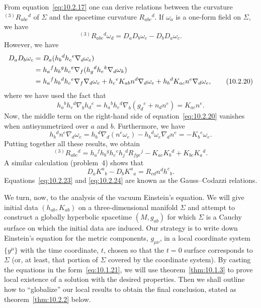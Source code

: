 From equation~\eqref{eq:10.2.17} one can derive relations between the curvature
\({}^{(3)}R_{abc}{}^d\) of \(\Sigma\) and the spacetime curvature \(R_{abc}{}^d\).
If \(\omega_a\) is a one-form field on \(\Sigma\), we have
\begin{equation}
  {}^{(3)}R_{abc}{}^d\omega_d=D_aD_b\omega_c-D_bD_a\omega_c.
  \tag{10.2.19}\label{eq:10.2.19}
\end{equation}
However, we have
\begin{align}
  D_aD_b\omega_c
  &=D_a(h_b{}^dh_c{}^e\nabla_d\omega_e) \notag\\
  &=h_a{}^fh_b{}^gh_c{}^e
    \nabla_f(h_g{}^dh_e{}^k\nabla_d\omega_k) \notag\\
  &=h_a{}^fh_b{}^dh_c{}^e\nabla_f\nabla_d\omega_e
    +h_c{}^eK_{ab}n^d\nabla_d\omega_e
    +h_b{}^dK_{ac}n^e\nabla_d\omega_e,
  \tag{10.2.20}\label{eq:10.2.20}
\end{align}
where we have used the fact that
\begin{equation}
  h_a{}^bh_c{}^d\nabla_bh_d{}^e
  =h_a{}^bh_c{}^d\nabla_b(g_d{}^e+n_dn^e)=K_{ac}n^e.
  \tag{10.2.21}\label{eq:10.2.21}
\end{equation}
Now, the middle term on the right-hand side of equation~\eqref{eq:10.2.20}
vanishes when antisymmetrized over \(a\) and \(b\). Furthermore, we have
\begin{equation}
  h_b{}^dn^e\nabla_d\omega_e
  =h_b{}^d\nabla_d(n^e\omega_e)-h_b{}^d\omega_e\nabla_dn^e
  =-K_b{}^e\omega_e.
  \tag{10.2.22}\label{eq:10.2.22}
\end{equation}
Putting together all these results, we obtain
\begin{equation}
  {}^{(3)}R_{abc}{}^d
  =h_a{}^fh_b{}^gh_c{}^eh_j{}^dR_{fge}{}^j
   -K_{ac}K_b{}^d+K_{bc}K_a{}^d.
  \tag{10.2.23}\label{eq:10.2.23}
\end{equation}
A similar calculation (problem~4) shows that
\begin{equation}
  D_aK^a{}_b-D_bK^a{}_a=R_{cd}n^dh^c{}_b.
  \tag{10.2.24}\label{eq:10.2.24}
\end{equation}
Equations~\eqref{eq:10.2.23} and \eqref{eq:10.2.24} are known as the
Gauss--Codazzi relations. %

We turn, now, to the analysis of the vacuum Einstein's equation. We will give initial
data \((h_{ab},K_{ab})\) on a three-dimensional manifold \(\Sigma\) and attempt to
construct a globally hyperbolic spacetime \((M,g_{ab})\) for which \(\Sigma\) is a
Cauchy surface on which the initial data are induced. Our strategy is to write down
Einstein's equation for the metric components, \(g_{\mu\nu}\), in a local coordinate
system \(\{y^\mu\}\) with the time coordinate, \(t\), chosen so that the \(t=0\)
surface corresponds to \(\Sigma\) (or, at least, that portion of \(\Sigma\) covered by
the coordinate system). By casting the equations in the form~\eqref{eq:10.1.21}, we
will use theorem~\ref{thm:10.1.3} to prove local existence of a solution with the
desired properties. Then we shall outline how to ``globalize'' our local results to
obtain the final conclusion, stated as theorem~\ref{thm:10.2.2} below.

